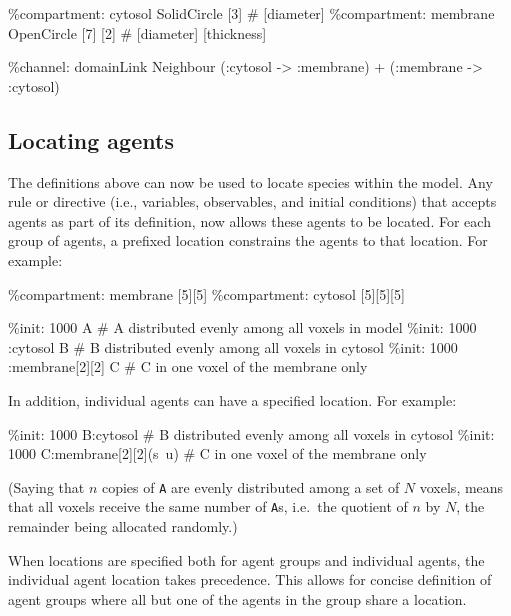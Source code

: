 \documentclass[english]{report}
\def\tod#1{\todo{\sf #1}}
\begin{document}
\begin{kappasource}
\%compartment: cytosol   SolidCircle   [3]           # [diameter]
\%compartment: membrane  OpenCircle    [7] [2]       # [diameter] [thickness]

\%channel: domainLink Neighbour (:cytosol -> :membrane) + (:membrane -> :cytosol)
\end{kappasource}


\subsection{Locating agents}

The definitions above can now be used to locate species within the model. Any rule or directive (i.e., variables, observables, and initial conditions) that accepts agents as part of its definition, now allows these agents to be located. For each group of agents, a prefixed location constrains the agents to that location. For example: 


\begin{kappasource}
\%compartment: membrane [5][5]
\%compartment: cytosol  [5][5][5]

\%init: 1000 A                   # A distributed evenly among all voxels in model 
\%init: 1000 :cytosol B          # B distributed evenly among all voxels in cytosol
\%init: 1000 :membrane[2][2] C   # C in one voxel of the membrane only 
\end{kappasource}

In addition, individual agents can have a specified location. For example:
\begin{kappasource}
\%init: 1000 B:cytosol             # B distributed evenly among all voxels in cytosol
\%init: 1000 C:membrane[2][2](s~u) # C in one voxel of the membrane only 
\end{kappasource}

(Saying that $n$ copies of \Verb+A+ are evenly distributed among a set of $N$ voxels, means that all voxels receive the same number of \Verb+A+s, i.e.\ the quotient of $n$ by $N$, the remainder being allocated randomly.)

When locations are specified both for agent groups and individual agents, the individual agent location takes precedence. This allows for concise definition of agent groups where all but one of the agents in the group share a location.
\end{document}
